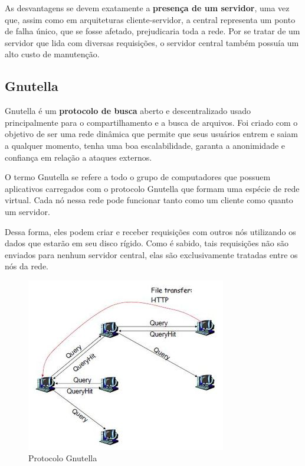\documentclass[a4paper]{article}
\begin{document}
As desvantagens se devem exatamente a \textbf{presença de um servidor}, uma vez que, assim como em arquiteturas cliente-servidor, a central representa um ponto de falha único, que se fosse afetado, prejudicaria toda a rede. Por se tratar de um servidor que lida com diversas requisições, o servidor central também possuía um alto custo de manutenção.

\subsection{Gnutella} %
Gnutella é um \textbf{protocolo de busca} aberto e descentralizado usado principalmente para o compartilhamento e a busca de arquivos. Foi criado com o objetivo de ser uma rede dinâmica que permite que seus usuários entrem e saiam a qualquer momento, tenha uma boa escalabilidade, garanta a anonimidade  e confiança em relação a ataques externos.\cite{gayatriGN}

O termo Gnutella se refere a todo o grupo de computadores que possuem aplicativos carregados com o protocolo Gnutella que formam uma espécie de rede virtual. Cada nó nessa rede pode funcionar tanto como um cliente como quanto um servidor. 

Dessa forma, eles podem criar e receber requisições com outros nós utilizando os dados que estarão em seu disco rígido. Como é sabido, tais requisições não são enviados para nenhum servidor central, elas são exclusivamente tratadas entre os nós da rede. 

\begin{figure}[!h]
\begin{center}
  \includegraphics{img//gnuquery.JPG} 
  \caption{Protocolo Gnutella \cite{examplesofp2p} \label{figure1}}
\end{center}
\end{figure}
\end{document}
